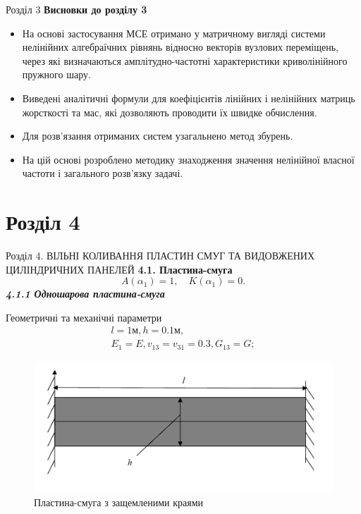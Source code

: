 \documentclass[8pt]{beamer}
\numberwithin{figure}{section}
\numberwithin{equation}{section}
\numberwithin{table}{section}
\begin{document}
\begin{frame}{Розділ 3}
\textbf{Висновки до розділу 3}
\\
\vspace{1em}
\begin{itemize}
\item На основі застосування МСЕ отримано у матричному вигляді системи нелінійних алгебраїчних рівнянь відносно векторів вузлових переміщень, через які визначаються амплітудно-частотні характеристики криволінійного пружного шару.
\item Виведені аналітичні формули для коефіцієнтів лінійних і нелінійних матриць жорсткості та мас, які дозволяють проводити їх швидке обчислення.
\item Для розв'язання отриманих систем узагальнено метод збурень.
\item На цій основі розроблено методику знаходження значення нелінійної власної частоти і загального розв'язку задачі. 
\end{itemize}

\end{frame}

\section{Розділ 4}
\begin{frame}{Розділ 4. ВІЛЬНІ КОЛИВАННЯ ПЛАСТИН СМУГ ТА ВИДОВЖЕНИХ ЦИЛІНДРИЧНИХ ПАНЕЛЕЙ}
\textbf{4.1. Пластина-смуга}
\begin{equation}
A\left( \alpha_1 \right)=1, \quad K\left( \alpha_1 \right)=0.
\end{equation}
\textbf{\textit{4.1.1 Одношарова пластина-смуга}}
\vspace{1em}

Геометричні та механічні  параметри
\begin{equation}
\begin{gathered}
l=1\text{м}, h=0.1\text{м},\\
E_1=E, v_{13}=v_{31}=0.3, G_{13}=G;
\end{gathered}
\end{equation}
\begin{figure}
	\includegraphics[scale=0.3]{pic/plate.png}
		\caption{Пластина-смуга з защемленими краями}
		\label{fig:plate}
\end{figure}



\end{frame}
\end{document}
